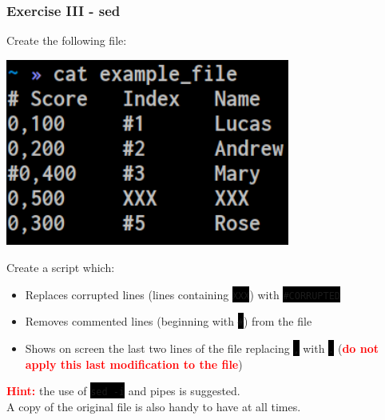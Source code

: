 \documentclass[unknownkeysallowed, 10pt, a4 paper, handout]{beamer}
\newcommand{\focus}[1]{\textbf{\textcolor{red}{#1}}}
\newcommand{\code}[1]{\colorbox{black}{\color{green}\texttt{#1}}}
\newcommand{\sidebyside}[5]{
  \begin{minipage}{#1\textwidth}
    #2
  \end{minipage} #3 \begin{minipage}{#4\textwidth}
    #5
  \end{minipage}
}
\begin{document}
\begin{frame}
  \begin{center}
    \frametitle{Exercise III - sed}

    \sidebyside{0.35}{
      Create the following file:
    }{\hfill}{0.60}{
      \begin{center}
        \includegraphics[width=0.70\textwidth]{pics/ex_3.png}
      \end{center}
    }

    \vspace{2mm}

    Create a script which:

    \begin{itemize}
      \item Replaces corrupted lines (lines containing \code{XXX}) with
        \code{\#CORRUPTED}
      \item Removes commented lines (beginning with \code{\#}) from the file
      \item Shows on screen the last two lines of the file replacing \code{,}
        with \code{.} (\focus{do not apply this last modification to the file})
    \end{itemize}

    \vspace{2mm}

    \focus{Hint:} the use of \code{sed -i} and pipes is suggested.\\
    A copy of the original file is also handy to have at all times.
  \end{center}
\end{frame}
\end{document}
